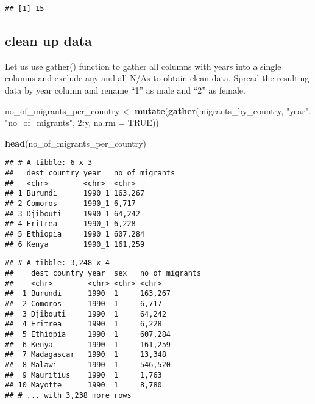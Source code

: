 \documentclass[]{article}
\newenvironment{Shaded}{\begin{snugshade}}{\end{snugshade}}
\newcommand{\KeywordTok}[1]{\textcolor[rgb]{0.13,0.29,0.53}{\textbf{#1}}}
\newcommand{\DataTypeTok}[1]{\textcolor[rgb]{0.13,0.29,0.53}{#1}}
\newcommand{\DecValTok}[1]{\textcolor[rgb]{0.00,0.00,0.81}{#1}}
\newcommand{\StringTok}[1]{\textcolor[rgb]{0.31,0.60,0.02}{#1}}
\newcommand{\OtherTok}[1]{\textcolor[rgb]{0.56,0.35,0.01}{#1}}
\newcommand{\OperatorTok}[1]{\textcolor[rgb]{0.81,0.36,0.00}{\textbf{#1}}}
\newcommand{\NormalTok}[1]{#1}
\begin{document}
\begin{verbatim}
## [1] 15
\end{verbatim}

\subsection{clean up data}\label{clean-up-data}

Let us use gather() function to gather all columns with years into a
single columns and exclude any and all N/As to obtain clean data. Spread
the resulting data by year column and rename ``1'' as male and ``2'' as
female.

\begin{Shaded}
\begin{Highlighting}[]
\NormalTok{no_of_migrants_per_country <-}\StringTok{ }\KeywordTok{mutate}\NormalTok{(}\KeywordTok{gather}\NormalTok{(migrants_by_country, }\StringTok{"year"}\NormalTok{, }\StringTok{"no_of_migrants"}\NormalTok{, }\DecValTok{2}\OperatorTok{:}\NormalTok{y, }\DataTypeTok{na.rm =} \OtherTok{TRUE}\NormalTok{))}

\KeywordTok{head}\NormalTok{(no_of_migrants_per_country)}
\end{Highlighting}
\end{Shaded}

\begin{verbatim}
## # A tibble: 6 x 3
##   dest_country year   no_of_migrants
##   <chr>        <chr>  <chr>         
## 1 Burundi      1990_1 163,267       
## 2 Comoros      1990_1 6,717         
## 3 Djibouti     1990_1 64,242        
## 4 Eritrea      1990_1 6,228         
## 5 Ethiopia     1990_1 607,284       
## 6 Kenya        1990_1 161,259
\end{verbatim}

\begin{Shaded}
\end{Shaded}

\begin{verbatim}
## # A tibble: 3,248 x 4
##    dest_country year  sex   no_of_migrants
##    <chr>        <chr> <chr> <chr>         
##  1 Burundi      1990  1     163,267       
##  2 Comoros      1990  1     6,717         
##  3 Djibouti     1990  1     64,242        
##  4 Eritrea      1990  1     6,228         
##  5 Ethiopia     1990  1     607,284       
##  6 Kenya        1990  1     161,259       
##  7 Madagascar   1990  1     13,348        
##  8 Malawi       1990  1     546,520       
##  9 Mauritius    1990  1     1,763         
## 10 Mayotte      1990  1     8,780         
## # ... with 3,238 more rows
\end{verbatim}
\end{document}
